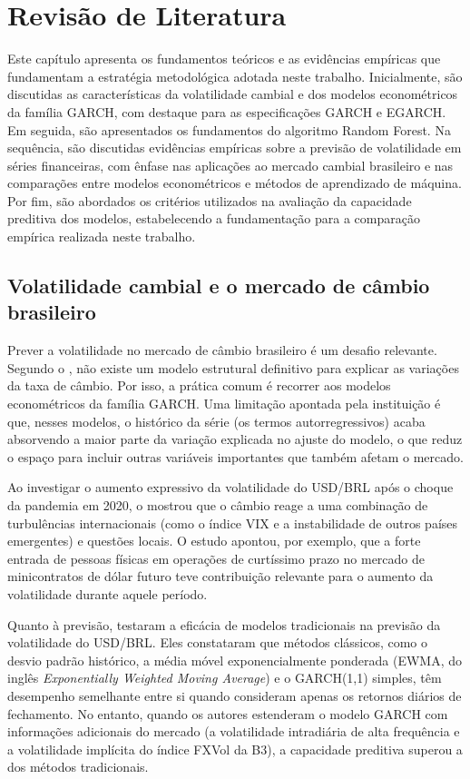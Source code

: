 \chapter{Revisão de Literatura}
Este capítulo apresenta os fundamentos teóricos e as evidências empíricas que fundamentam a estratégia metodológica adotada neste trabalho. Inicialmente, são discutidas as características da volatilidade cambial e dos modelos econométricos da família GARCH, com destaque para as especificações GARCH e EGARCH. Em seguida, são apresentados os fundamentos do algoritmo Random Forest. Na sequência, são discutidas evidências empíricas sobre a previsão de volatilidade em séries financeiras, com ênfase nas aplicações ao mercado cambial brasileiro e nas comparações entre modelos econométricos e métodos de aprendizado de máquina. Por fim, são abordados os critérios utilizados na avaliação da capacidade preditiva dos modelos, estabelecendo a fundamentação para a comparação empírica realizada neste trabalho.

\section{Volatilidade cambial e o mercado de câmbio brasileiro}
Prever a volatilidade no mercado de câmbio brasileiro é um desafio relevante. Segundo o \textcite{bacen2021volatilidade}, não existe um modelo estrutural definitivo para explicar as variações da taxa de câmbio. Por isso, a prática comum é recorrer aos modelos econométricos da família GARCH. Uma limitação apontada pela instituição é que, nesses modelos, o histórico da série (os termos autorregressivos) acaba absorvendo a maior parte da variação explicada no ajuste do modelo, o que reduz o espaço para incluir outras variáveis importantes que também afetam o mercado.

Ao investigar o aumento expressivo da volatilidade do USD/BRL após o choque da pandemia em 2020, o \textcite{bacen2021volatilidade} mostrou que o câmbio reage a uma combinação de turbulências internacionais (como o índice VIX e a instabilidade de outros países emergentes) e questões locais. O estudo apontou, por exemplo, que a forte entrada de pessoas físicas em operações de curtíssimo prazo no mercado de minicontratos de dólar futuro teve contribuição relevante para o aumento da volatilidade durante aquele período. 

Quanto à previsão, \textcite{campani2018forecasting} testaram a eficácia de modelos tradicionais na previsão da volatilidade do USD/BRL. Eles constataram que métodos clássicos, como o desvio padrão histórico, a média móvel exponencialmente ponderada (EWMA, do inglês \textit{Exponentially Weighted Moving Average}) e o GARCH(1,1) simples, têm desempenho semelhante entre si quando consideram apenas os retornos diários de fechamento. No entanto, quando os autores estenderam o modelo GARCH com informações adicionais do mercado (a volatilidade intradiária de alta frequência e a volatilidade implícita do índice FXVol da B3), a capacidade preditiva superou a dos métodos tradicionais. 

